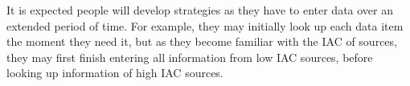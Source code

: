 \begin{table}
It is expected people will develop strategies as they have to enter data over an extended period of time. For example, they may initially look up each data item the moment they need it, but as they become familiar with the IAC of sources, they may first finish entering all information from low IAC sources, before looking up information of high IAC sources. 







\end{table}
